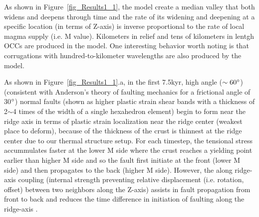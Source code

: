 As shown in Figure~\ref{fig_Results1_1}, the model create a median valley that both widens and deepens through time and the rate of its widening and deepening at a specific location (in terms of Z-axis) is inverse proportional to the rate of local magma supply (i.e. M value). Kilometers in relief and tens of kilometers in lentgh OCCs are produced in the model. One interesting behavior worth noting is that corrugations with hundred-to-kilometer wavelengths are also produced by the model.

As shown in Figure~\ref{fig_Results1_1}.a, in the first 7.5kyr, high angle ($\sim 60 \degree$)(consistent with  Anderson's theory of faulting mechanics for a frictional angle of 30$\degree$) normal faults (shown as higher plastic strain shear bands with a thickness of 2$\sim$4 times of the width of a single hexahedron element) begin to form near the ridge axis in terms of plastic strain localization near the ridge center (weakest place to deform), because of the thickness of the crust is thinnest at the ridge center due to our thermal structure setup. For each timestep, the tensional stress accummulates faster at the lower M side where the crust reaches a yielding point earlier than higher M side and so the fault first initiate at the front (lower M side) and then propagates to the back (higher M side). However, the along ridge-axis coupling (internal strength preventing relative displacement (i.e. rotation, offset) between two neighbors along the Z-axis) assists in fault propagation from front to back and reduces the time difference in initiation of faulting along the ridge-axis .  

